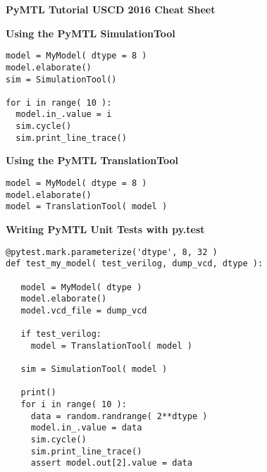 \documentclass{cbxdoc}
\begin{document}
\begin{landscape}
\small

\begin{center}
  \textbf{\Large PyMTL
    Tutorial  \hspace{0.5em}\textbullet\hspace{0.5em}
    USCD 2016 \hspace{0.5em}\textbullet\hspace{0.5em}
    Cheat Sheet}
\end{center}

\hfill
\begin{minipage}[t]{3.25in}
\vspace{0pt}

\colorbox{gray!30!white}{\parbox{1.025\tw}{\rule[-0.4em]{0pt}{1.4em}\centering\textbf{%
  Using the PyMTL SimulationTool%
}}}

\smallskip
\begin{lstlisting}[numbers={none},xleftmargin={0.1in}]
model = MyModel( dtype = 8 )
model.elaborate()
sim = SimulationTool()

for i in range( 10 ):
  model.in_.value = i
  sim.cycle()
  sim.print_line_trace()
\end{lstlisting}

\vspace{0.15in}
\colorbox{gray!30!white}{\parbox{1.025\tw}{\rule[-0.4em]{0pt}{1.4em}\centering\textbf{%
  Using the PyMTL TranslationTool%
}}}

\smallskip
\begin{lstlisting}[numbers={none},xleftmargin={0.1in}]
model = MyModel( dtype = 8 )
model.elaborate()
model = TranslationTool( model )
\end{lstlisting}

\vspace{0.15in}
\colorbox{gray!30!white}{\parbox{1.025\tw}{\rule[-0.4em]{0pt}{1.4em}\centering\textbf{%
  Writing PyMTL Unit Tests with py.test%
}}}

\smallskip
\begin{lstlisting}[numbers={none},xleftmargin={0.1in}]
@pytest.mark.parameterize('dtype', 8, 32 )
def test_my_model( test_verilog, dump_vcd, dtype ):

   model = MyModel( dtype )
   model.elaborate()
   model.vcd_file = dump_vcd

   if test_verilog:
     model = TranslationTool( model )

   sim = SimulationTool( model )

   print()
   for i in range( 10 ):
     data = random.randrange( 2**dtype )
     model.in_.value = data
     sim.cycle()
     sim.print_line_trace()
     assert model.out[2].value = data
\end{lstlisting}


\end{minipage}
\end{landscape}
\end{document}

